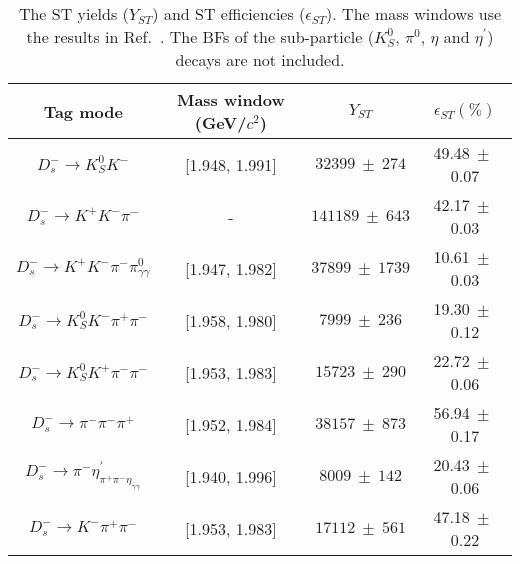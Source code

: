 \begin{table}[htbp]
    \caption{ The ST yields ($Y_{ST}$) and ST efficiencies ($\epsilon_{ST}$). 
    The mass windows use the results in Ref.~\cite{Doc-DB-630-v35}. 
The BFs of the sub-particle ($K_{S}^{0}$, $\pi^{0}$, $\eta$ and $\eta^{'}$) decays are not included.}
    \label{ST-eff}
    \begin{center}
        \begin{tabular}{cccc}
            \toprule\toprule
            Tag mode & Mass window (GeV/$c^{2}$)  & $Y_{ST}$  & $\epsilon_{ST}(\%)$\\
            \hline
            $D_{s}^{-} \rightarrow K_{S}^{0}K^{-}$                          & [1.948, 1.991]    & $32399\ \pm\ 274$               & 49.48$\ \pm\ $0.07\\
            $D_{s}^{-} \rightarrow K^{+}K^{-}\pi^{-}$                       & -                 & $141189\ \pm\ 643$              & 42.17$\ \pm\ $0.03\\
            $D_{s}^{-} \rightarrow K^{+}K^{-}\pi^{-}\pi^{0}_{\gamma\gamma}$                & [1.947, 1.982]    & $37899\ \pm\ 1739$              & 10.61$\ \pm\ $0.03\\
            $D_{s}^{-} \rightarrow K_{S}^{0}K^{-}\pi^{+}\pi^{-}$            & [1.958, 1.980]    & $7999\ \pm\ 236$               & 19.30$\ \pm\ $0.12\\
            $D_{s}^{-} \rightarrow K_{S}^{0}K^{+}\pi^{-}\pi^{-}$            & [1.953, 1.983]    & $15723\ \pm\ 290$               & 22.72$\ \pm\ $0.06\\
            $D_{s}^{-} \rightarrow \pi^{-}\pi^{-}\pi^{+}$                   & [1.952, 1.984]    & $38157\ \pm\ 873$              & 56.94$\ \pm\ $0.17\\
            $D_{s}^{-} \rightarrow \pi^{-}\eta_{\pi^{+}\pi^{-}\eta_{\gamma\gamma}}^{'}$          & [1.940, 1.996]    & $8009\ \pm\ 142$               & 20.43$\ \pm\ $0.06\\
            $D_{s}^{-} \rightarrow K^{-}\pi^{+}\pi^{-}$                     & [1.953, 1.983]    & $17112\ \pm\ 561$               & 47.18$\ \pm\ $0.22\\
            \bottomrule\bottomrule
        \end{tabular}
    \end{center}
\end{table}

